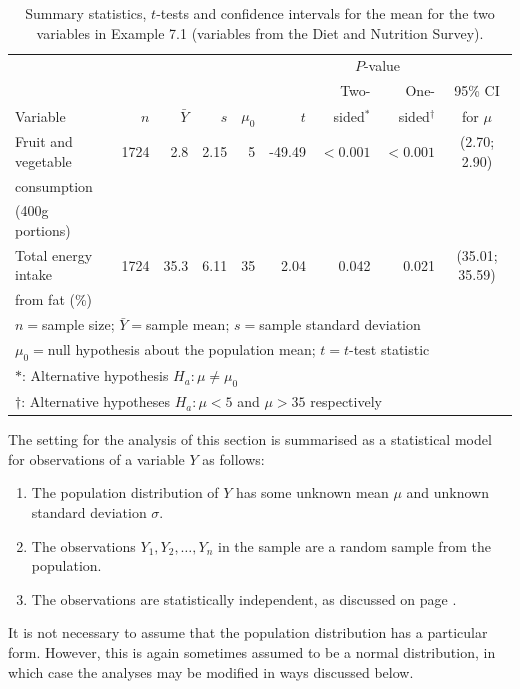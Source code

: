 \begin{table}
\caption{Summary statistics, $t$-tests and confidence intervals
for the mean for the two variables in Example 7.1
(variables from the Diet and Nutrition Survey).}
\label{t_ttests1}
\begin{center}
\begin{tabular}{|l|rrr|rrrr|c|}\hline
 & & & & & &\multicolumn{2}{c|}{$P$-value} & \\
  & & & & & & Two-& One- & 95\% CI \\
Variable&   $n$ & $\bar{Y}$ & $s$ & $\mu_{0}$ & $t$ & sided$^{*}$
& sided$^{\dagger}$ & for $\mu$\\
\hline
Fruit and vegetable & 1724 & 2.8 & 2.15
& 5 & -49.49 & $<0.001$&
$<0.001$& (2.70; 2.90)\\
consumption &  & & & & & & & \\
(400g portions)  & &  & & & & & & \\
Total energy intake & 1724 & 35.3& 6.11 & 35 & 2.04 & 0.042 &
0.021 & (35.01; 35.59)\\
from fat (\%) & & & & & &  & & \\
\hline
\multicolumn{9}{l}{{\footnotesize $n=$sample size; $\bar{Y}=$sample
mean; $s=$sample standard deviation
}}\\
\multicolumn{9}{l}{{\footnotesize$\mu_{0}=$null hypothesis about the
population mean; $t=t$-test statistic}}\\
\multicolumn{9}{l}{{\footnotesize $*$: Alternative hypothesis $H_{a}:
\mu\ne \mu_{0}$}}\\
\multicolumn{9}{l}{{\footnotesize $\dagger$: Alternative hypotheses $H_{a}:
\mu<5$ and $\mu>35$ respectively}}
\end{tabular}
\end{center}
\end{table}

The setting for the analysis of this section is summarised as a
statistical model for observations of a variable $Y$ as follows:
\begin{enumerate}
\item
The population distribution of
$Y$ has some unknown mean $\mu$ and unknown standard deviation $\sigma$.
\item
The observations $Y_{1}, Y_{2}, \dots, Y_{n}$ in the sample are a
random sample from the population.
\item
The observations are statistically independent,
as discussed on
page \pageref{p_2sample}.
\end{enumerate}
It is not necessary to assume that the population distribution
has a particular form. However, this is again sometimes assumed to be a normal
distribution, in which case the analyses may be modified in ways
discussed below.

